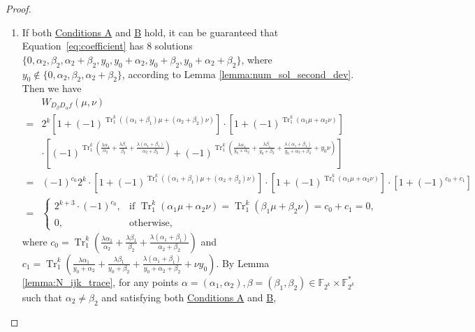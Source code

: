 \documentclass[preprint,10pt]{elsarticle}
\newcommand{\F}{\mathbb{F}}
\newcommand{\0}{\textbf{0}}
\newcommand{\1}{\textbf{1}}
\newcommand{\TRACE}{\operatorname{Tr}_1^k}
\theoremstyle{plain}
\begin{document}
\begin{proof}
\begin{enumerate}[label=\textbf{Case \arabic*},wide = 0pt]
            \item If both \hyperref[item_a]{\textsf{Conditions A}} and \hyperref[item_b]{\textsf{B}} hold,\label{case_2}
            it can be guaranteed that Equation~\eqref{eq:coefficient} has $8$ solutions $\{0,\alpha_2,\beta_2,\alpha_2+\beta_2,y_0,y_0+\alpha_2,y_0+\beta_2,y_0+\alpha_2+\beta_2\}$, where $y_0\notin\{0,\alpha_2,\beta_2,\alpha_2+\beta_2\}$, according to Lemma \ref{lemma:num_sol_second_dev}.
            Then we have
            \begin{align*}
            &W_{D_{\beta}D_{\alpha}f}(\mu,\nu)\nonumber\\
                =&2^k\left[1+(-1)^{\TRACE\left((\alpha_1+\beta_1)\mu+ (\alpha_2+\beta_2)\nu\right)}\right]\cdot
                \left[1+(-1)^{\TRACE\left(\alpha_1\mu+\alpha_2\nu\right)}\right]\nonumber\\
                &\cdot
                \left[(-1)^{\TRACE\left(\frac{\lambda\alpha_1}{\alpha_2}+\frac{\lambda\beta_1}{\beta_2}+\frac{\lambda(\alpha_1+\beta_1)}{\alpha_2+\beta_2}\right)}+(-1)^{\TRACE\left(\frac{\lambda\alpha_1}{y_0+\alpha_2}+\frac{\lambda\beta_1}{y_0+\beta_2}+\frac{\lambda(\alpha_1+\beta_1)}{y_0+\alpha_2+\beta_2}+ y_0\nu\right)}\right]\nonumber\\
                =&(-1)^{c_0}2^k\cdot\left[1+(-1)^{\TRACE\left((\alpha_1+\beta_1)\mu+ (\alpha_2+\beta_2)\nu\right)}\right]\cdot
                \left[1+(-1)^{\TRACE\left(\alpha_1\mu+\alpha_2\nu\right)}\right]\cdot\left[1+(-1)^{c_0+c_1}\right]\nonumber\\
                =&\begin{cases}
                    2^{k+3}\cdot(-1)^{c_0},&\text{if }\TRACE\left(\alpha_1\mu+\alpha_2\nu\right)=\TRACE\left(\beta_1\mu+\beta_2\nu\right)=c_0+c_1=0,\\
                    0,&\text{otherwise},
                \end{cases}
            \end{align*}
            where
            $c_0=\TRACE\left(\frac{\lambda\alpha_1}{\alpha_2}+\frac{\lambda\beta_1}{\beta_2}+\frac{\lambda(\alpha_1+\beta_1)}{\alpha_2+\beta_2}\right)$
            and
            $c_1= \TRACE\left(\frac{\lambda\alpha_1}{y_0+\alpha_2}+\frac{\lambda\beta_1}{y_0+\beta_2}+\frac{\lambda(\alpha_1+\beta_1)}{y_0+\alpha_2+\beta_2}+\nu y_0\right)$.
            By Lemma \ref{lemma:N_ijk_trace},
            for any points $\alpha=(\alpha_1,\alpha_2),\beta=(\beta_1,\beta_2)\in\F_{2^k}\times\F_{2^k}^*$ such that
            $\alpha_2\ne\beta_2$ and satisfying both \hyperref[item_a]{\textsf{Conditions A}} and \hyperref[item_b]{\textsf{B}},

\end{enumerate}
\end{proof}
\end{document}
